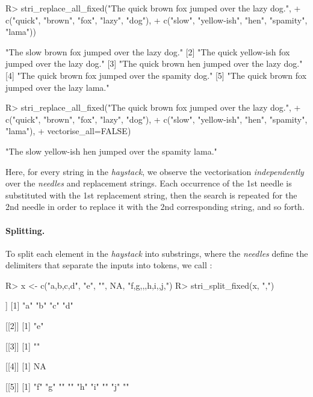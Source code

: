 \documentclass[nojss]{jss}
\begin{document}
\begin{Schunk}
\begin{Sinput}
R> stri_replace_all_fixed("The quick brown fox jumped over the lazy dog.",
+    c("quick", "brown",      "fox", "lazy",    "dog"),
+    c("slow",  "yellow-ish", "hen", "spamity", "lama"))
\end{Sinput}
\begin{Soutput}
[1] "The slow brown fox jumped over the lazy dog."
[2] "The quick yellow-ish fox jumped over the lazy dog."
[3] "The quick brown hen jumped over the lazy dog."
[4] "The quick brown fox jumped over the spamity dog."
[5] "The quick brown fox jumped over the lazy lama."
\end{Soutput}
\begin{Sinput}
R> stri_replace_all_fixed("The quick brown fox jumped over the lazy dog.",
+    c("quick", "brown",      "fox", "lazy", "dog"),
+    c("slow",  "yellow-ish", "hen", "spamity", "lama"),
+    vectorise_all=FALSE)
\end{Sinput}
\begin{Soutput}
[1] "The slow yellow-ish hen jumped over the spamity lama."
\end{Soutput}
\end{Schunk}

\noindent
Here, for every string in the \textit{haystack}, we observe the vectorisation
\textit{independently} over the \textit{needles} and replacement strings.
Each occurrence of the 1st needle is substituted with the 1st replacement
string, then the search is repeated for the 2nd needle in order to replace
it with the 2nd corresponding string, and so forth.


\paragraph{Splitting.}
To  split each element in the \textit{haystack} into substrings,
where the \textit{needles} define the delimiters that separate
the inputs into tokens,
we call :

\begin{Schunk}
\begin{Sinput}
R> x <- c("a,b,c,d", "e", "", NA, "f,g,,,h,i,,j,")
R> stri_split_fixed(x, ",")
\end{Sinput}
\begin{Soutput}
[[1]]
[1] "a" "b" "c" "d"

[[2]]
[1] "e"

[[3]]
[1] ""

[[4]]
[1] NA

[[5]]
[1] "f" "g" ""  ""  "h" "i" ""  "j" ""
\end{Soutput}
\end{Schunk}
\end{document}
